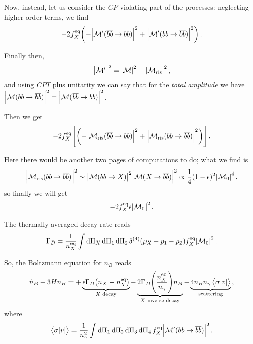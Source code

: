 \documentclass[main.tex]{subfiles}
\begin{document}
Now, instead, let us consider the \(CP\) violating part of the processes: neglecting higher order terms, we find 
%
\begin{align}
- 2 f_X^{\text{eq}} \qty(- \abs{\mathcal{M}'(\overline{b} \overline{b} \to bb)}^2 + \abs{\mathcal{M}' (bb \to \overline{b} \overline{b})}^2)
\,.
\end{align}

Finally then, 
%
\begin{align}
\abs{\mathcal{M}'}^2 = \abs{\mathcal{M}}^2 - \abs{\mathcal{M}_{\text{ris}}}^2
\,,
\end{align}
%
and using \(CPT\) plus unitarity we can say that for the \emph{total amplitude} we have \(\abs{\mathcal{M}(bb \to \overline{b}\overline{b})}^2 = \abs{\mathcal{M}(\overline{b}\overline{b} \to bb)}^2\).

Then we get 
%
\begin{align}
-2 f_X^{\text{eq}} \qty[\qty(- \abs{\mathcal{M}_{\text{ris}}(\overline{b} \overline{b} \to bb)}^2 + \abs{\mathcal{M}_{\text{ris}} (bb \to \overline{b} \overline{b})}^2)]
\,.
\end{align}

Here there would be another two pages of computations to do; what we find is 
%
\begin{align}
\abs{\mathcal{M}_{\text{ris}}(bb \to \overline{b}\overline{b})}^2
\sim 
\abs{\mathcal{M}(bb \to X)}^2
\abs{\mathcal{M}(X \to \overline{b}\overline{b})}^2
\propto \frac{1}{4} (1 - \epsilon )^2 \abs{\mathcal{M}_0}^4
\,,
\end{align}
%
so finally we will get 
%
\begin{align}
-2 f_X^{\text{eq}} \epsilon \abs{\mathcal{M}_0}^2
\,.
\end{align}

The thermally averaged decay rate reads 
%
\begin{align}
\Gamma _D = \frac{1}{n_X^{\text{eq}}} \int \dd{\Pi _X} \dd{\Pi_1 } \dd{\Pi _2} \delta^{(4)} (p_X - p_1 - p_2 ) f_X^{\text{eq}} \abs{\mathcal{M}_0 }^2
\,.
\end{align}

So, the Boltzmann equation for \(n_B\) reads
%
\begin{align}
\dot{n}_B + 3 H n_B = + \underbrace{\epsilon \Gamma _D \qty(n_X - n_X^{\text{eq}})}_{X \text{ decay}}
- \underbrace{2 \Gamma _D \qty( \frac{n_X^{\text{eq}}}{n_\gamma }) n_B }_{X \text{ inverse decay}}
- \underbrace{4 n_B n_\gamma \expval{\sigma \abs{v}}}_{\text{scattering}}
\,,
\end{align}
%
where 
%
\begin{align}
\expval{\sigma \abs{v}} = \frac{1}{n_\gamma^2}
\int \dd{\Pi_1 } \dd{\Pi_2 } \dd{\Pi_3 } \dd{\Pi_4 }
f_X^{\text{eq}} \abs{\mathcal{M}' (bb \to \overline{b}\overline{b})}^2
\,.
\end{align}
\end{document}
